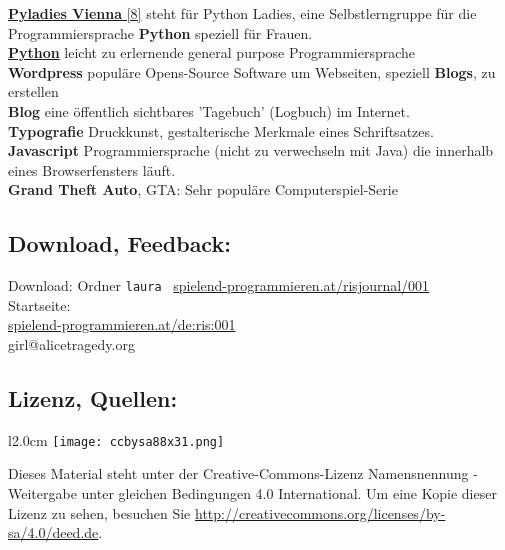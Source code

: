 \documentclass[10pt,a4paper,ngerman,twoside]{article} %
\begin{document}
\href{https://twitter.com/pyladies_vie}{\textbf{Pyladies Vienna} [8]} steht für Python Ladies, eine Selbstlerngruppe für die Programmiersprache  \textbf{Python} speziell für Frauen. \\

\href{http://python.org}{\textbf{Python}} leicht zu erlernende general purpose Programmiersprache \\

\textbf{Wordpress} populäre Opens-Source Software um Webseiten, speziell \textbf{Blogs}, zu erstellen \\

\textbf{Blog} eine öffentlich sichtbares 'Tagebuch' (Logbuch) im Internet. \\

\textbf{Typografie} Druckkunst, gestalterische Merkmale eines Schriftsatzes. \\

\textbf{Javascript} Programmiersprache (nicht zu verwechseln mit Java) die innerhalb eines Browserfensters läuft. \\

\textbf{Grand Theft Auto}, GTA: Sehr populäre Computerspiel-Serie 

\subsection*{Download, Feedback:}
\footnotesize{
Download: Ordner \texttt{laura} \Mundus\ \href{http://spielend-programmieren.at/risjournal/001}{spielend-programmieren.at/risjournal/001}\\
Startseite:\\
\href{http://spielend-programmieren.at/de:ris:001}{spielend-programmieren.at/de:ris:001}\\ 
\Letter\:  girl@alicetragedy.org \\}
\normalsize
 

\subsection*{Lizenz, Quellen:}

\begin{wrapfigure}{l}{2.0cm}
\texttt{[image: ccbysa88x31.png]}
\end{wrapfigure}
Dieses Material steht unter der Creative-Commons-Lizenz Namensnennung - Weitergabe unter gleichen Bedingungen 4.0 International. Um eine Kopie dieser Lizenz zu sehen, besuchen Sie \url{http://creativecommons.org/licenses/by-sa/4.0/deed.de}.
\end{document}
